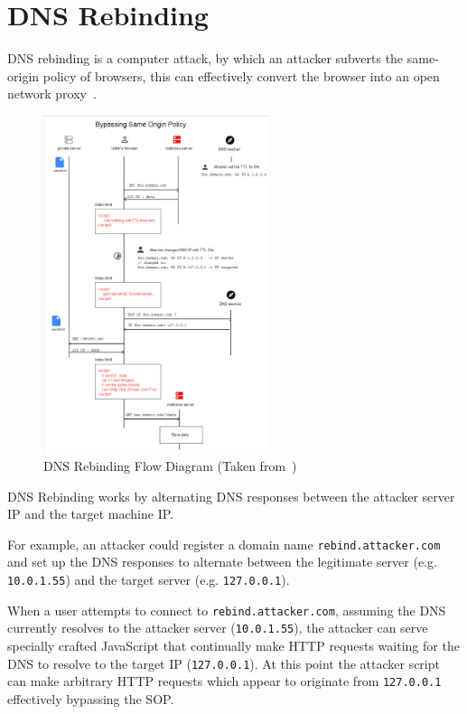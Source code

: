 \chapter{DNS Rebinding}

DNS rebinding is a computer attack, by which an attacker subverts the
same-origin policy of browsers, this can effectively convert the browser into
an open network proxy~\cite{jackson2009protecting}.

\vspace{0.5cm}

\begin{figure}[H]
\begin{center}
\includegraphics[width=0.59\textwidth,keepaspectratio]
{img/dnsrebindingflow.jpg}
	\caption{DNS Rebinding Flow Diagram (Taken from~\cite{vulnsec})}
\end{center}
\end{figure}

\vspace{0.5cm}

DNS Rebinding works by alternating DNS responses between the attacker server IP
and the target machine IP.

For example, an attacker could register a domain name
\texttt{rebind.attacker.com} and set up the DNS responses to alternate between
the legitimate server (e.g. \texttt{10.0.1.55}) and the target server (e.g.
\texttt{127.0.0.1}).

When a user attempts to connect to \texttt{rebind.attacker.com}, assuming the
DNS currently resolves to the attacker server (\texttt{10.0.1.55}), the
attacker can serve specially crafted JavaScript that continually make HTTP
requests waiting for the DNS to resolve to the target IP (\texttt{127.0.0.1}).
At this point the attacker script can make arbitrary HTTP requests which appear
to originate from \texttt{127.0.0.1} effectively bypassing the SOP.

